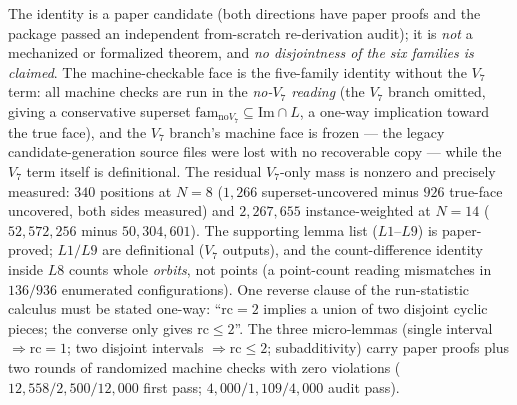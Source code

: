 \begin{remark}
\label{rem:clacoverriders}
The identity is a paper candidate (both directions have paper proofs and
the package passed an independent from-scratch re-derivation audit); it is
\emph{not} a mechanized or formalized theorem, and \emph{no disjointness
of the six families is claimed}. The machine-checkable face is the
five-family identity without the $V_7$ term: all machine checks are run in
the \emph{no-$V_7$ reading} (the $V_7$ branch omitted, giving a
conservative superset $\mathrm{fam}_{\mathrm{no}V_7}\subseteq
\mathrm{Im}\cap L$, a one-way implication toward the true face), and the
$V_7$ branch's machine face is frozen --- the legacy candidate-generation
source files were lost with no recoverable copy --- while the $V_7$ term
itself is definitional. The residual $V_7$-only mass is nonzero and
precisely measured: $340$ positions at $N=8$ ($1{,}266$ superset-uncovered
minus $926$ true-face uncovered, both sides measured) and $2{,}267{,}655$
instance-weighted at $N=14$ ($52{,}572{,}256$ minus $50{,}304{,}601$).
The supporting lemma list ($L1$--$L9$) is paper-proved; $L1/L9$ are
definitional ($V_7$ outputs), and the count-difference identity inside
$L8$ counts whole \emph{orbits}, not points (a point-count reading
mismatches in $136/936$ enumerated configurations). One reverse clause of
the run-statistic calculus must be stated one-way: ``$\mathrm{rc}=2$
implies a union of two disjoint cyclic pieces; the converse only gives
$\mathrm{rc}\le2$''. The three micro-lemmas (single interval
$\Rightarrow\mathrm{rc}=1$; two disjoint intervals
$\Rightarrow\mathrm{rc}\le2$; subadditivity) carry paper proofs plus two
rounds of randomized machine checks with zero violations ($12{,}558 /
2{,}500 / 12{,}000$ first pass; $4{,}000/1{,}109/4{,}000$ audit pass).
\end{remark}

